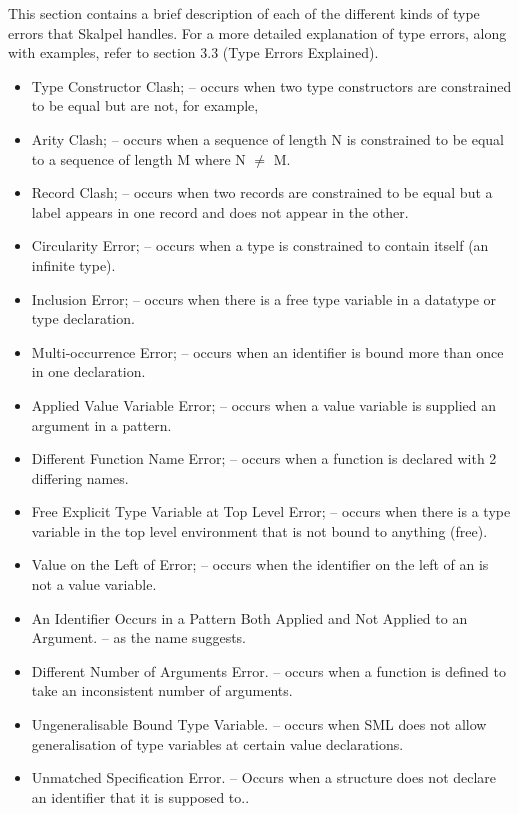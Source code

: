 \documentclass{report}
\begin{document}
This section contains a brief description of each of the different
kinds of type errors that Skalpel handles. For a more
detailed explanation of type errors, along with examples, refer to
section 3.3 (Type Errors Explained).

\begin{itemize}

\item Type Constructor Clash; \subitem -- occurs
  when two type constructors are constrained to be equal but
  are not, for example, 
\item Arity Clash; \subitem -- occurs when a sequence of length N is
  constrained to be equal to a sequence of length M where N $\neq$ M.
\item Record Clash; \subitem -- occurs when two records are
  constrained to be equal but a label appears in one record and does
  not appear in the other.
\item Circularity Error; \subitem -- occurs when a type is
  constrained to contain itself (an infinite type).
\item Inclusion Error; \subitem -- occurs when there is a free type
  variable in a datatype or type declaration.
\item Multi-occurrence Error; \subitem -- occurs when an identifier
  is bound more than once in one declaration.
\item Applied Value Variable Error; \subitem -- occurs when a value
  variable is supplied an argument in a pattern.
\item Different Function Name Error; \subitem -- occurs when a
  function is declared with 2 differing names.
\item Free Explicit Type Variable at Top Level Error; \subitem --
  occurs when there is a type variable in the top level environment
  that is not bound to anything (free).
\item Value on the Left of  Error; \subitem --
  occurs when the identifier on the left of an  is
  not a value variable.
\item An Identifier Occurs in a Pattern Both Applied and Not Applied to
  an Argument. \subitem -- as the name suggests.
\item Different Number of Arguments Error.  \subitem -- occurs when a
  function is defined to take an inconsistent number of arguments.
\item Ungeneralisable Bound Type Variable.  \subitem -- occurs when SML does
  not allow generalisation of type variables at certain value
  declarations.
\item Unmatched Specification Error. \subitem -- Occurs when a structure does not declare an identifier that it is supposed to..
\end{itemize}
\end{document}
